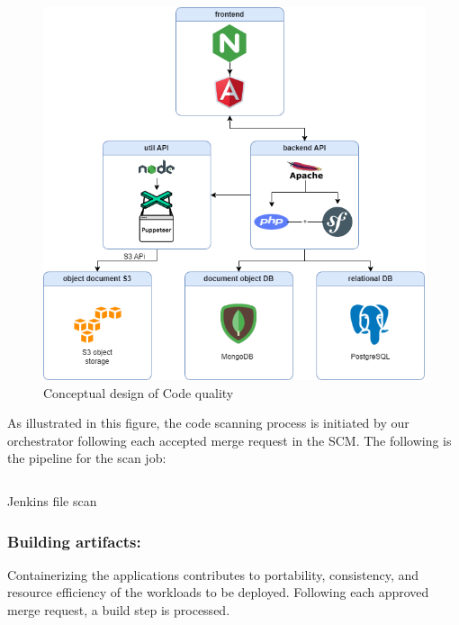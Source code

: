 \begin{figure}[H]\centering
\includegraphics[width=1.0\textwidth,angle=00]{assets/f47.png}
\caption{ Conceptual design of Code quality }
\label{fig:conceptual design of Code quality }
\end{figure}



As illustrated in this figure, the code scanning process is initiated by our orchestrator following each accepted merge request in the SCM. The following is the pipeline for the scan job: 

 
\begin{listing}[H]
    \inputminted{Dockerfile}{codeListing/Jenkinsfile_scan}
    \caption{ Jenkins file scan}
    \label{lst:jenkinsfile_scan}
\end{listing}
 

\subsubsection{Building artifacts: }


Containerizing the applications contributes to portability, consistency, and resource efficiency of the workloads to be deployed. Following each approved merge request, a build step is processed. 

